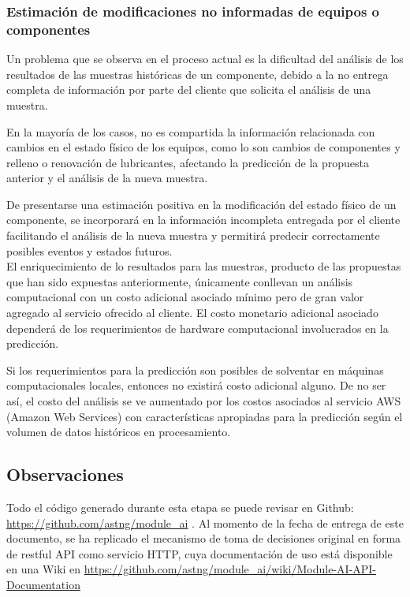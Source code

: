 \documentclass{article}
\begin{document}
\subsubsection{Estimación de modificaciones no informadas de equipos o componentes}

Un problema que se observa en el proceso actual es la dificultad del análisis de los resultados de las muestras históricas de un componente, debido a la no entrega completa de información por parte del cliente que solicita el análisis de una muestra.

En la mayoría de los casos, no es compartida la información relacionada con cambios en el estado físico de los equipos, como lo son cambios de componentes y relleno o renovación de lubricantes, afectando la predicción de la propuesta anterior y el análisis de la nueva muestra.

De presentarse una estimación positiva en la modificación del estado físico de un componente, se incorporará en la información incompleta entregada por el cliente facilitando el análisis de la nueva muestra y permitirá predecir correctamente posibles eventos y estados futuros.
\\
El enriquecimiento de lo resultados para las muestras, producto de las propuestas que han sido expuestas anteriormente, únicamente conllevan un análisis computacional con un costo adicional asociado mínimo pero de gran valor agregado al servicio ofrecido al cliente. El costo monetario adicional asociado dependerá de los requerimientos de hardware computacional involucrados en la predicción. 

Si los requerimientos para la predicción son posibles de solventar en máquinas computacionales locales, entonces no existirá costo adicional alguno. De no ser así, el costo del análisis se ve aumentado por los costos asociados al servicio AWS (Amazon Web Services) con características apropiadas para la predicción según el volumen de datos históricos en procesamiento.

\subsection{Observaciones}
Todo el código generado durante esta etapa se puede revisar en Github: \url{https://github.com/astng/module_ai} . Al momento de la fecha de entrega de este documento, se ha replicado el mecanismo de toma de decisiones original en forma de restful API como servicio HTTP, cuya documentaci\'on de uso est\'a disponible en una Wiki en \url{https://github.com/astng/module_ai/wiki/Module-AI-API-Documentation}
\end{document}
